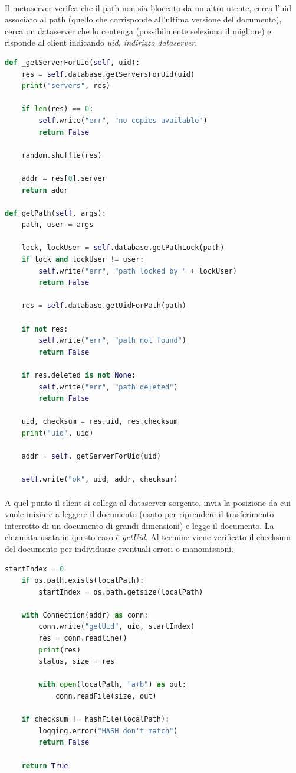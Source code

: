 \documentclass[11pt,a4paper,english]{article}
\begin{document}
\paragraph{} Il metaserver verifca che il path non sia bloccato da un altro utente, cerca l'uid associato al path (quello che corrisponde all'ultima versione del documento), cerca un dataserver che lo contenga (possibilmente seleziona il migliore) e risponde al client indicando \emph{uid, indirizzo dataserver}.

\begin{lstlisting}[language=Python, title=Metaserver]
def _getServerForUid(self, uid):
	res = self.database.getServersForUid(uid)
	print("servers", res)
	
	if len(res) == 0:
		self.write("err", "no copies available")
		return False
	
	random.shuffle(res)
	
	addr = res[0].server
	return addr	

def getPath(self, args):
    path, user = args

    lock, lockUser = self.database.getPathLock(path)
    if lock and lockUser != user:
        self.write("err", "path locked by " + lockUser)
        return False

    res = self.database.getUidForPath(path)

    if not res:
        self.write("err", "path not found")
        return False

    if res.deleted is not None:
        self.write("err", "path deleted")
        return False

    uid, checksum = res.uid, res.checksum
    print("uid", uid)

    addr = self._getServerForUid(uid)

    self.write("ok", uid, addr, checksum)
\end{lstlisting}

\paragraph{} A quel punto il client si collega al dataserver sorgente, invia la posizione da cui vuole iniziare a leggere il documento (usato per riprendere il trasferimento interrotto di un documento di grandi dimensioni) e legge il documento. La chiamata usata in questo caso è \emph{getUid}. Al termine viene verificato il checksum del documento per individuare eventuali errori o manomissioni. 

\begin{lstlisting}[language=Python, title=Client]
    startIndex = 0
    if os.path.exists(localPath):
        startIndex = os.path.getsize(localPath)

    with Connection(addr) as conn:
        conn.write("getUid", uid, startIndex)
        res = conn.readline()
        print(res)
        status, size = res

        with open(localPath, "a+b") as out:
            conn.readFile(size, out)

    if checksum != hashFile(localPath):
        logging.error("HASH don't match")
        return False

    return True
\end{lstlisting}
\end{document}

